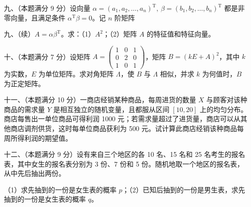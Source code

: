 \documentclass[UTF8,12pt]{ctexart}
\begin{document}
九、（本题满分 9 分）设向量 \(\displaystyle \alpha=(a_1,\allowbreak a_2,\allowbreak \ldots,\allowbreak a_n)^{\mathrm T},\allowbreak \ \beta=(b_1,\allowbreak b_2,\allowbreak \ldots,\allowbreak b_n)^{\mathrm T}\) 都是非零向量，且满足条件 \(\displaystyle \alpha^{\mathrm T}\beta=0\)。记 \(\displaystyle n\) 阶矩阵


九、（续）\(\displaystyle A=\alpha\beta^{\mathrm T}\)。求：（1）\(\displaystyle A^2\)；（2）矩阵 \(\displaystyle A\) 的特征值和特征向量。


十、（本题满分 7 分）设矩阵 \(\displaystyle A=\begin{pmatrix}1&0&1\\0&2&0\\1&0&1\end{pmatrix}\)，矩阵 \(\displaystyle B=(kE+A)^2\)，其中 \(\displaystyle k\) 为实数，\(\displaystyle E\) 为单位矩阵。求对角矩阵 \(\displaystyle \Lambda\)，使 \(\displaystyle B\) 与 \(\displaystyle \Lambda\) 相似，并求 \(\displaystyle k\) 为何值时，\(\displaystyle B\) 为正定矩阵。


十一、（本题满分 10 分）一商店经销某种商品，每周进货的数量 \(\displaystyle X\) 与顾客对该种商品的需求量 \(\displaystyle Y\) 是相互独立的随机变量，且都服从区间 \(\displaystyle [10,\allowbreak 20]\) 上的均匀分布。商店每售出一单位商品可得利润 1000 元；若需求量超过了进货量，商店可以从其他商店调剂供货，这时每单位商品获利为 500 元。试计算此商店经销该种商品每周所得利润的期望值。


十二、（本题满分 9 分）设有来自三个地区的各 10 名、15 名和 25 名考生的报名表，其中女生的报名表分别为 3 份、7 份和 5 份。随机地取一个地区的报名表，从中先后抽出两份。


（1）求先抽到的一份是女生表的概率 \(\displaystyle p\)；（2）已知后抽到的一份是男生表，求先抽到的一份是女生表的概率 \(\displaystyle q\)。
\end{document}

